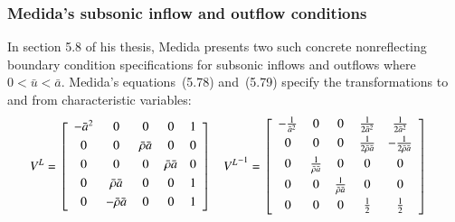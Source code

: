 \documentclass[letterpaper,11pt,nointlimits,reqno,draft]{amsbook}
\begin{document}
\subsubsection{Medida's subsonic inflow and outflow conditions}

In section 5.8 of his thesis, Medida presents two such concrete nonreflecting
boundary condition specifications for subsonic inflows and outflows where $0 <
\bar{u} < \bar{a}$.  Medida's equations~(5.78) and~(5.79) specify the
transformations to and from characteristic variables:
\begin{align}
\label{eq:dimeulerapproxmedidaproj}
  V^L &= \left[\begin{array}{ccccc}
    -\bar{a}^2 & 0                   & 0                  & 0                  & 1 \\ \noalign{\smallskip}
    0          & 0                   & \bar{\rho} \bar{a} & 0                  & 0 \\ \noalign{\smallskip}
    0          & 0                   & 0                  & \bar{\rho} \bar{a} & 0 \\ \noalign{\smallskip}
    0          & \bar{\rho} \bar{a}  & 0                  & 0                  & 1 \\ \noalign{\smallskip}
    0          & -\bar{\rho} \bar{a} & 0                  & 0                  & 1 \\ \noalign{\smallskip}
  \end{array}\right]
&
  {V^L}^{-1} &= \left[\begin{array}{ccccc}
    -\frac{1}{\bar{a}^2} & 0                            & 0                            & \frac{1}{2\bar{a}^2}          & \frac{1}{2\bar{a}^2}            \\ \noalign{\smallskip}
    0                    & 0                            & 0                            & \frac{1}{2\bar{\rho} \bar{a}} & - \frac{1}{2\bar{\rho} \bar{a}} \\ \noalign{\smallskip}
    0                    & \frac{1}{\bar{\rho} \bar{a}} & 0                            & 0                             & 0                               \\ \noalign{\smallskip}
    0                    & 0                            & \frac{1}{\bar{\rho} \bar{a}} & 0                             & 0                               \\ \noalign{\smallskip}
    0                    & 0                            & 0                            & \frac{1}{2}                   & \frac{1}{2}                     \\ \noalign{\smallskip}
  \end{array}\right]
\end{align}
\end{document}

